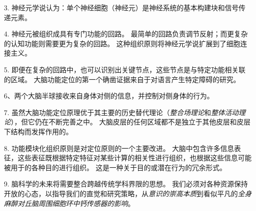 3. 神经元学说认为：单个神经细胞（神经元）是神经系统的基本构建块和信号传递元素。


4. 神经元被组织成具有专门功能的回路。
最简单的回路负责调节反射；而更复杂的认知功能则需要更为复杂的回路。
这种组织原则将神经元学说扩展到了细胞连接主义。


5. 即便在复杂的回路中，也可以识别出关键节点，这些节点是与特定功能相关联的区域。
大脑功能定位的第一个确凿证据来自于对语言产生特定障碍的研究。


6、两个大脑半球接收来自身体对侧的信息，并控制对侧身体的行为。


7. 虽然大脑功能定位原理优于其主要的历史替代理论（\textit{整合场理论}和\textit{整体活动理论}），但它仍在不断完善之中。
大脑皮层的任何区域都不是独立于其他皮层和皮层下结构而发挥作用的。


8. 功能模块化组织原则是对定位原则的一个主要改进。
大脑中包含许多信息表征，这些表征既根据特定特征对某些计算的相关性进行组织，也根据这些信息可能被用于的各种目的进行组织。
这是一种关于目的或潜在行为的冗余形式。


9. 脑科学的未来将需要整合跨越传统学科界限的思想。
我们必须对各种资源保持开放的心态，以指导我们的直觉和研究策略，从\textit{意识的崇高本质}到看似平凡的\textit{全身麻醉对丘脑周围细胞环中钙传感器的影响}。




















